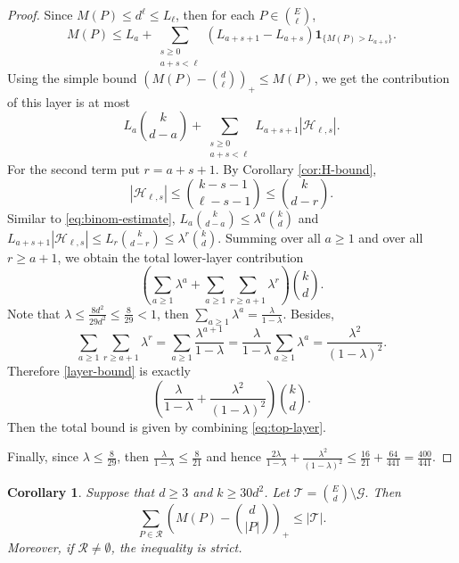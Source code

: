 \documentclass[11pt]{article}
\numberwithin{equation}{section}
\newtheorem{corollary}[theorem]{Corollary}
\begin{document}
\begin{proof}
 Since $M(P)\le d^\ell\le L_\ell$, then
		for each $P\in\binom{E}{\ell}$,
		\[
		M(P)
		\le
		L_a+
		\sum_{\substack{s\ge 0\\ a+s<\ell}}
		(L_{a+s+1}-L_{a+s})\mathbf 1_{\{M(P)>L_{a+s}\}}.
		\]
		Using the simple bound $\left(M(P)-\binom{d}{\ell}\right)_+\le M(P)$, we get the contribution of this layer is at most
		\[
		L_a\binom{k}{d-a}
		+
		\sum_{\substack{s\ge 0\\ a+s<\ell}}
		L_{a+s+1}|\mathcal H_{\ell,s}|.
		\]
	For the second term put
		$
		r=a+s+1.
		$
		By Corollary \ref{cor:H-bound},
		\[
		|\mathcal H_{\ell,s}|
		\le
		\binom{k-s-1}{\ell-s-1}\le \binom{k}{d-r}.
		\]
		Similar to \eqref{eq:binom-estimate},
		$
		L_a\binom{k}{d-a}
		\le
		\lambda^a\binom{k}{d}
		$
		 and $
		L_{a+s+1}|\mathcal H_{\ell,s}|
		\le
		L_r\binom{k}{d-r}
		\le
		\lambda^r\binom{k}{d}.
		$
		Summing over all $a\ge 1$ and over all $r\ge a+1$, we obtain the total lower-layer contribution
		\begin{equation}\label{layer-bound}
		\left(
		\sum_{a\ge 1}\lambda^a
		+
		\sum_{a\ge 1}\sum_{r\ge a+1}\lambda^r
		\right)
		\binom{k}{d}.
		\end{equation}
		Note that $\lambda\le\frac{8d^2}{29d^2}\le\frac{8}{29}<1$, then $\sum\limits_{a\ge 1}\lambda^a=\frac{\lambda}{1-\lambda}$. Besides, $$\sum_{a\ge 1}\sum_{r\ge a+1}\lambda^r=\sum_{a\ge 1}{\frac{\lambda^{a+1}}{1-\lambda}}=\frac{\lambda}{1-\lambda}\sum\limits_{a\ge 1}\lambda^a=\frac{\lambda^2}{(1-\lambda)^2}.$$
		Therefore \eqref{layer-bound} is exactly
		\[
		\left(
		\frac{\lambda}{1-\lambda}
		+
		\frac{\lambda^2}{(1-\lambda)^2}
		\right)
		\binom{k}{d}.
		\]
		Then the total bound is given by combining \eqref{eq:top-layer}.
		
		Finally, since $\lambda\le\frac{8}{29}$,
		then
		$
		\frac{\lambda}{1-\lambda}\le \frac{8}{21}
		$
		and hence
		$
		\frac{2\lambda}{1-\lambda}
		+
		\frac{\lambda^2}{(1-\lambda)^2}
		\le
		\frac{16}{21}+\frac{64}{441}
		=
		\frac{400}{441}.
		$
	\end{proof}
\begin{corollary}\label{cor:charging}
	Suppose that $d\ge 3$ and $k\ge 30d^2$.  Let
	$
	\mathcal{T}=\binom{E}{d}\setminus\mathcal G.
	$
	Then
	\[
	\sum_{P\in\mathcal R}
	\left(M(P)-\binom{d}{|P|}\right)_+
	\le
	|\mathcal{T}|.
	\]
	Moreover, if $\mathcal R\ne\emptyset$, the inequality is strict.
\end{corollary}
\end{document}
